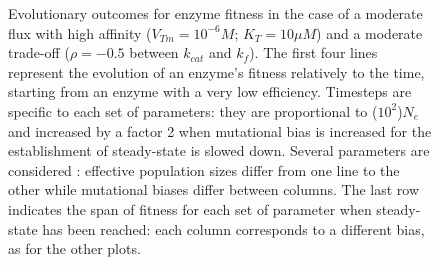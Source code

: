 \begin{figure}[H]
\begin{center}
\vspace{-0.1cm}
\caption{\small Evolutionary outcomes for enzyme fitness in the case of a moderate flux with high affinity ($V_{Tm}=10^{-6}M$; $K_T=10\mu M$) and a moderate trade-off ($\rho=-0.5$ between $k_{cat}$ and $k_f$). The first four lines represent the evolution of an enzyme's fitness relatively to the time, starting from an enzyme with a very low efficiency. Timesteps are specific to each set of parameters: they are proportional to ($10^2$)$N_e$ and increased by a factor 2 when mutational bias is increased for the establishment of steady-state is slowed down. Several parameters are considered : effective population sizes differ from one line to the other while mutational biases differ between columns. The last row indicates the span of fitness for each set of parameter when steady-state has been reached: each column corresponds to a different bias, as for the other plots.\normalsize}
\label{fig6a-ann}
\end{center}
\end{figure}

